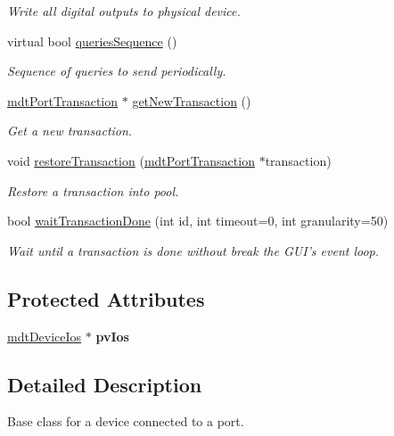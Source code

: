 \begin{DoxyCompactItemize}
\begin{DoxyCompactList}\small\item\em Write all digital outputs to physical device. \end{DoxyCompactList}\item 
virtual bool \hyperlink{classmdt_device_acba50968d201ad95c4eaa2ab2ed48b4f}{queriesSequence} ()
\begin{DoxyCompactList}\small\item\em Sequence of queries to send periodically. \end{DoxyCompactList}\item 
\hyperlink{classmdt_port_transaction}{mdtPortTransaction} $\ast$ \hyperlink{classmdt_device_a0e57cc8b749581cff447d514b9a1ff8e}{getNewTransaction} ()
\begin{DoxyCompactList}\small\item\em Get a new transaction. \end{DoxyCompactList}\item 
void \hyperlink{classmdt_device_a4619d8be240cafe48865a89f7424de92}{restoreTransaction} (\hyperlink{classmdt_port_transaction}{mdtPortTransaction} $\ast$transaction)
\begin{DoxyCompactList}\small\item\em Restore a transaction into pool. \end{DoxyCompactList}\item 
bool \hyperlink{classmdt_device_ab67f2da4f294482dd39ce6294ada8bc4}{waitTransactionDone} (int id, int timeout=0, int granularity=50)
\begin{DoxyCompactList}\small\item\em Wait until a transaction is done without break the GUI's event loop. \end{DoxyCompactList}\end{DoxyCompactItemize}
\subsection*{Protected Attributes}
\begin{DoxyCompactItemize}
\item 
\hypertarget{classmdt_device_aa84e01b13f98fc35476a2654f1c8d2b3}{
\hyperlink{classmdt_device_ios}{mdtDeviceIos} $\ast$ {\bfseries pvIos}}
\label{classmdt_device_aa84e01b13f98fc35476a2654f1c8d2b3}

\end{DoxyCompactItemize}


\subsection{Detailed Description}
Base class for a device connected to a port. 

